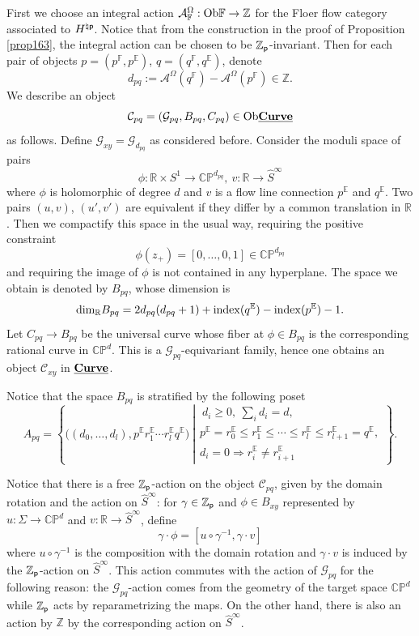 \documentclass[reqno, 10pt]{amsart}
\numberwithin{equation}{section}
\numberwithin{equation}{section}
\theoremstyle{definition}
\theoremstyle{remark}
\newcommand{\beqn}{\begin{equation*}}
\newcommand{\eeqn}{\end{equation*}}
\newcommand{\mb}{\mathbb}
\newcommand{\mc}{\mathcal}
\newcommand{\p}{{\sf p}}
\newcommand{\zp}{{{\mb Z}_{\sf p}}}
\newcommand{\ep}{{{\mathbb E}}}
\newcommand{\wh}{\widehat}
\newcommand{\uds}[1]{\underline{\smash{#1}}}
\begin{document}
First we choose an integral action ${\mc A}_{{\mb F}}^\Omega: {\rm Ob}{\mb F} \to {\mb Z}$ for the Floer flow category associated to $H^{\natural \p}$. Notice that from the construction in the proof of Proposition \ref{prop163}, the integral action can be chosen to be $\zp$-invariant. Then for each pair of objects $p = (p^{\mb F}, p^{\mb E})$, $q = (q^{\mb F}, q^{\mb E})$, denote
\beqn
d_{pq}:= {\mc A}^\Omega(q^{{\mb F}}) - {\mc A}^\Omega(p^{\mb F}) \in {\mb Z}.
\eeqn
We describe an object
\beqn
{\mc C}_{pq}  = ({\mc G}_{pq}, B_{pq}, C_{pq})\in {\rm Ob}\uds{\bf Curve}
\eeqn
as follows. Define ${\mc G}_{xy} = {\mc G}_{d_{pq}}$ as considered before. Consider the  moduli space of pairs
\beqn
\phi: {\mb R} \times S^1 \to \mb{CP}^{d_{pq}},\ v: {\mb R} \to \wh S^\infty
\eeqn
where $\phi$ is holomorphic of degree $d$ and $v$ is a flow line connection $p^{\mb E}$ and $q^{\mb E}$. Two pairs $(u, v)$, $(u', v')$ are equivalent if they differ by a common translation in ${\mb R}$. Then we compactify this space in the usual way, requiring the positive constraint
\beqn
\phi (z_+) = [0,\ldots, 0, 1] \in \mb{CP}^{d_{pq}}
\eeqn
and requiring the image of $\phi$ is not contained in any hyperplane. The space we obtain is denoted by $B_{pq}$, whose dimension is 
\beqn
{\rm dim}_{\mb R} B_{pq} = 2d_{pq} (d_{pq} +1) + {\rm index} ( q^\ep ) - {\rm index} ( p^\ep ) - 1.
\eeqn
Let $C_{pq} \to B_{pq}$ be the universal curve whose fiber at $\phi \in B_{pq}$ is the corresponding rational curve in $\mb{CP}^d$. This is a ${\mc G}_{pq}$-equivariant family, hence one obtains an object ${\mc C}_{xy}$ in $\uds{\bf Curve}$.

Notice that the space $B_{pq}$ is stratified by the following poset
\beqn
A_{pq} = \left\{ \Big( (d_0, \ldots, d_l), p^\ep r_1^\ep \cdots r_l^\ep q^\ep \Big)\ \left|  \begin{array}{c} \ d_i \geq 0,\ \displaystyle \sum_i d_i = d,\\
p^\ep = r_0^\ep \leq r_1^\ep \leq \cdots \leq r_l^\ep \leq r_{l+1}^\ep =  q^\ep,\\
d_i = 0\Longrightarrow  r_i^\ep \neq r_{i+1}^\ep\      \end{array} \right. \right\}.
\eeqn

Notice that there is a free $\zp$-action on the object ${\mc C}_{pq}$, given by the domain rotation and the action on $\wh S^\infty$: for $\gamma \in \zp$ and $\phi \in B_{xy}$ represented by $u: \Sigma \to \mb{CP}^d$ and $v: {\mb R} \to \wh S^\infty$, define 
\beqn
\gamma \cdot \phi = [u \circ \gamma^{-1}, \gamma\cdot v]
\eeqn
where $u\circ \gamma^{-1}$ is the composition with the domain rotation and $\gamma \cdot v$ is induced by the $\zp$-action on $\wh S^\infty$. This action commutes with the action of ${\mc G}_{pq}$ for the following reason: the ${\mc G}_{pq}$-action comes from the geometry of the target space $\mb{CP}^d$ while $\zp$ acts by reparametrizing the maps. On the other hand, there is also an action by ${\mb Z}$ by the corresponding action on $\wh S^\infty$. 
\end{document}
